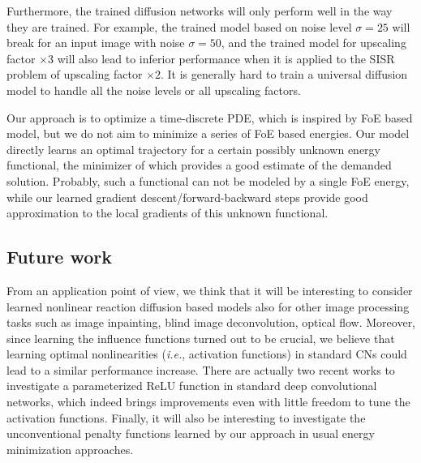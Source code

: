 \documentclass[10pt,journal,compsoc]{IEEEtran}
\newcommand{\ie}{\emph{i.e.}}
\begin{document}
Furthermore, the trained diffusion networks will only perform well in the way they are trained. For example, the trained model 
based on noise level $\sigma = 25$ will break for an input image with noise $\sigma = 50$, and the trained model for 
upscaling factor $\times 3$ will also lead to inferior performance when it is applied to the SISR problem of 
upscaling factor $\times 2$. It is generally hard to train a universal diffusion model to handle all the noise levels or 
all upscaling factors. 

Our approach is to optimize a time-discrete PDE, which is inspired by 
FoE based model, but we do not aim to minimize 
a series of FoE based energies. Our model directly learns an optimal trajectory 
for a certain possibly unknown energy functional, 
the minimizer of which provides a good estimate of the demanded solution. 
Probably, such a functional can not be modeled by a single FoE energy, 
while our learned gradient descent/forward-backward 
steps provide good approximation to the local gradients of this unknown functional.

\subsection{Future work} 
From an application point of view, we
think that it will be interesting to consider learned nonlinear reaction diffusion based models also 
for other image processing tasks
such as image inpainting, blind image deconvolution, optical
flow. Moreover, since learning the influence functions turned out to
be crucial, we believe that learning optimal nonlinearities (\ie, activation functions) in standard CNs
could lead to a similar performance increase. There are actually two recent works \cite{agostinelli2014learning, he2015delving} 
to investigate a parameterized ReLU function in standard deep convolutional networks, which indeed brings improvements even 
with little freedom to tune the activation functions. Finally, it will also be
interesting to investigate the unconventional penalty functions
learned by our approach in usual energy minimization approaches.


\begin{comment}
\ifCLASSOPTIONcompsoc
\section*{Acknowledgments}
\else
\section*{Acknowledgment}
\fi


The authors would like to thank...
\end{comment}
\end{document}
